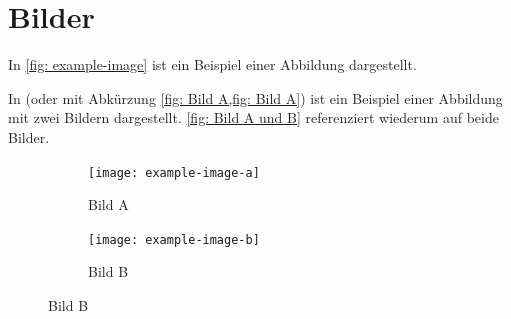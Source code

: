 \documentclass[./\jobname.tex]{subfiles}
\begin{document}
\chapter{Bilder}
%
In \autoref{fig: example-image} ist ein Beispiel einer Abbildung dargestellt.
%
\begin{figure}[H]
\centering
\noindent{}
	\label{fig: example-image}
\end{figure}
%
In  (oder mit Abkürzung \cref{fig: Bild A,fig: Bild A}) ist ein Beispiel einer Abbildung mit zwei Bildern dargestellt. \autoref{fig: Bild A und B} referenziert wiederum auf beide Bilder.
%
\begin{figure}[H]
	\centering
	\begin{subfigure}[b]{0.5\linewidth}
		\centering
		\texttt{[image: example-image-a]}
		\caption{Bild A}
		\label{fig: Bild A}
	\end{subfigure}%
	\begin{subfigure}[b]{0.5\linewidth}
		\centering
		\texttt{[image: example-image-b]}
		\caption{Bild B}
		\label{fig: Bild B}
	\end{subfigure}%
	\label{fig: Bild A und B}
\end{figure}
%
\end{document}
